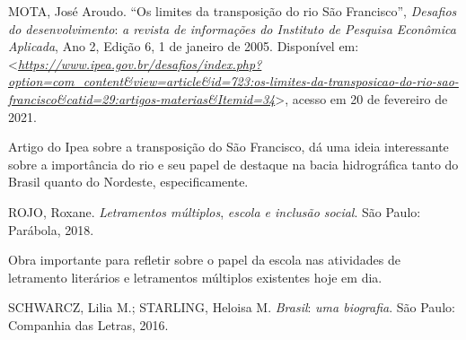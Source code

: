 \documentclass{extarticle}
\begin{document}
    MOTA, José Aroudo. ``Os limites da transposição do rio São
    Francisco'', \emph{Desafios do desenvolvimento}: \emph{a revista de
    informações do Instituto de Pesquisa Econômica Aplicada}, Ano 2,
    Edição 6, 1 de janeiro de 2005. Disponível em:
    \textless{}\href{https://www.ipea.gov.br/desafios/index.php?option=com_content\&view=article\&id=723:os-limites-da-transposicao-do-rio-sao-francisco\&catid=29:artigos-materias\&Itemid=34}{\emph{https://www.ipea.gov.br/desafios/index.php?option=com\_content\&view=article\&id=723:os-limites-da-transposicao-do-rio-sao-francisco\&catid=29:artigos-materias\&Itemid=34}}\textgreater{},
    acesso em 20 de fevereiro de 2021.

    Artigo do Ipea sobre a transposição do São Francisco, dá uma ideia
    interessante sobre a importância do rio e seu papel de destaque na
    bacia hidrográfica tanto do Brasil quanto do Nordeste,
    especificamente.

    ROJO, Roxane. \emph{Letramentos múltiplos}, \emph{escola e inclusão
    social}. São Paulo: Parábola, 2018.

    Obra importante para refletir sobre o papel da escola nas atividades
    de letramento literários e letramentos múltiplos existentes hoje em
    dia.

    \textsc{SCHWARCZ,} Lilia M.; \textsc{STARLING}, Heloisa M.
    \emph{Brasil}: \emph{uma biografia}. São Paulo: Companhia das
    Letras, 2016.
\end{document}
